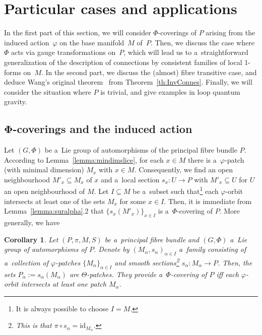 \documentclass[pdftex]{sigma}
\numberwithin{equation}{section}
\newtheorem{Corollary}[Theorem]{Corollary}
\begin{document}
\section{Particular cases and applications}\label{sec:PartCases}

In the f\/irst part of this section, we will consider $\Phi$-coverings of $P$ arising from the induced action~$\varphi$ on
the base manifold~$M$ of~$P$.
Then, we discuss the case where $\Phi$ acts via gauge transformations on~$P$, which will lead us to a~straightforward generalization of the description of connections by consistent families of local 1-forms
on~$M$.
In the second part, we discuss the (almost) f\/ibre transitive case, and deduce Wang's original theorem~\cite{Wang} from
Theorem~\ref{th:InvConnes}.
Finally, we will consider the situation where $P$ is trivial, and give examples in loop quantum gravity.

\subsection[$\Phi$-coverings and the induced action]{$\boldsymbol{\Phi}$-coverings and the induced action}%

Let $(G,\Phi)$ be a~Lie group of automorphisms of the principal f\/ibre bundle $P$.
According to Lemma~\ref{lemma:mindimslice}, for each $x\in M$ there is a~$\varphi$-patch (with minimal dimension) $M_x$
with $x\in M$.
Consequently, we find an open neighbourhood $M'_x\subseteq M_x$ of $x$ and a~local section $s_x\colon U\rightarrow P$
with $M'_x\subseteq U$ for $U$ an open neighbourhood of $M$.
Let $I\subseteq M$ be a~subset such that\footnote{It is always possible to choose $I=M$.} each $\varphi$-orbit
intersects at least one of the sets $M_x$ for some $x\in I$.
Then, it is immediate from Lemma~\ref{lemma:suralpha}.2 that $\{s_x(M'_x)\}_{x\in I}$ is a~$\Phi$-covering of $P$.
More generally, we have

\begin{Corollary}
\label{cor:reductions}
Let $(P,\pi,M,S)$ be a~principal fibre bundle and $(G,\Phi)$ a~Lie group of automorphisms of $P$.
Denote by $(M_\alpha,s_\alpha)_{\alpha\in I}$ a~family consisting of a~collection of $\varphi$-patches
$\{M_\alpha\}_{\alpha\in I}$ and smooth sections\footnote{This is that $\pi\circ s_\alpha= \mathrm{id}_{M_\alpha}$.}
$s_\alpha\colon M_\alpha\rightarrow P$.
Then, the sets $P_\alpha:=s_\alpha(M_\alpha)$ are $\Theta$-patches.
They provide a~$\Phi$-covering of $P$ iff each $\varphi$-orbit intersects at least one patch $M_\alpha$.
\end{Corollary}
\end{document}
